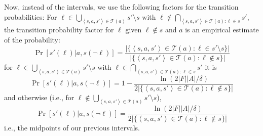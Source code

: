 \documentclass[letterpaper]{article} %
\newcommand{\tuple}[1]{\ensuremath{\left \langle #1 \right \rangle }}
\begin{document}
Now, instead of the intervals, we use the following factors for the transition probabilities: For $\ell\in\bigcup_{\tuple{s, a, s'}\in \mathcal{T}(a)} s'\setminus s $ with $\ell \notin \bigcap_{\tuple{s, a, s'}\in \mathcal{T}(a):\ell\in s}s'$, the transition probability factor for $\ell$ given $\ell\notin s$ and $a$ is an empirical estimate of the probability:
\begin{equation}
\Pr[s'(\ell)|a,s(\neg\ell)]=\frac{|\{\tuple{s, a, s'}\in \mathcal{T}(a):\ell\in s'\setminus s\}|}{|\{\tuple{s, a, s'}\in \mathcal{T}(a):\ell \notin s\}|}
\end{equation}
for $\ell\in\bigcup_{\tuple{s, a, s'}\in \mathcal{T}(a)} s'\setminus s $ with $\ell \in \bigcap_{\tuple{s, a, s'}\in \mathcal{T}(a):\ell\in s}s'$ it is
\begin{equation}
\Pr[s'(\ell)|a,s(\neg\ell)]=1-\frac{\ln(2|F||A|/\delta)}{2|\{\tuple{s, a, s'}\in \mathcal{T}(a):\ell\notin s\}|}
\end{equation}
and otherwise (i.e., for $\ell\notin\bigcup_{\tuple{s, a, s'}\in \mathcal{T}(a)} s'\setminus s $),
\begin{equation}
\Pr[s'(\ell)|a,s(\neg\ell)]=\frac{\ln(2|F||A|/\delta)}{2|\{\tuple{s, a, s'}\in \mathcal{T}(a):\ell\notin s\}|}
\end{equation}
i.e., the midpoints of our previous intervals.
\end{document}
